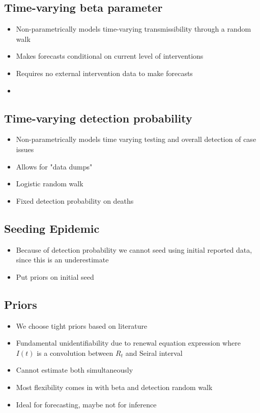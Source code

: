 \documentclass[11pt]{amsart}
\begin{document}
 \subsection{Time-varying beta parameter}
 \begin{itemize}
 \item Non-parametrically models time-varying transmissibility through a random walk
 \item Makes forecasts conditional on current level of interventions
 \item Requires no external intervention data to make forecasts 
 \item 
 \end{itemize}
 
 \subsection{Time-varying detection probability}
  \begin{itemize}
 \item Non-parametrically models time varying testing and overall detection of case issues
 \item Allows for "data dumps"
 \item Logistic random walk 
 \item Fixed detection probability on deaths

  \end{itemize}

\subsection{Seeding Epidemic}

 \begin{itemize}
 \item Because of detection probability we cannot seed using initial reported data, since this is an underestimate
 \item Put priors on initial seed
  \end{itemize}
  
  \subsection{Priors}

 \begin{itemize}
 \item We choose tight priors based on literature
  \item Fundamental unidentifiability due to renewal equation expression where $I(t)$ is a convolution between $R_t$ and Seiral interval
  \item Cannot estimate both simultaneously 
  \item Most flexibility comes in with beta and detection random walk
  \item Ideal for forecasting, maybe not for inference
  \end{itemize}
  
\end{document}
